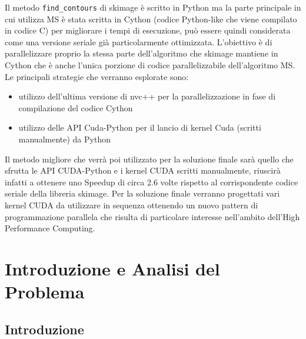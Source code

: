 \documentclass[12pt,a4paper]{report}
\begin{document}
Il metodo \verb|find_contours| di skimage è scritto in Python ma la parte principale in cui utilizza MS è stata scritta in Cython (codice Python-like che viene compilato in codice C) per migliorare i tempi di esecuzione, può essere quindi considerata come una versione seriale già particolarmente ottimizzata. \newline L'obiettivo è di parallelizzare proprio la stessa parte dell'algoritmo che skimage mantiene in Cython che è anche l'unica porzione di codice parallelizzabile dell'algoritmo MS. \newline
Le principali strategie che verranno esplorate sono:
\begin{itemize}
\item utilizzo dell'ultima versione di nvc++ per la parallelizzazione in fase di compilazione del codice Cython
\item utilizzo delle API Cuda-Python per il lancio di kernel Cuda (scritti manualmente) da Python 
\end{itemize}
Il metodo migliore che verrà poi utilizzato per la soluzione finale sarà quello che sfrutta le API CUDA-Python e i kernel CUDA scritti manualmente, riuscirà infatti a ottenere uno Speedup di circa 2.6 volte rispetto al corrispondente codice seriale della libreria skimage. \newline
Per la soluzione finale verranno progettati vari kernel CUDA da utilizzare in sequenza ottenendo un nuovo pattern di programmazione parallela che risulta di particolare interesse nell'ambito dell'High Performance Computing.



\chapter{Introduzione e Analisi del Problema}
\section{Introduzione}
\end{document}
